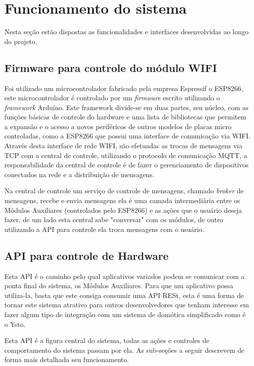 \chapter{Funcionamento do sistema}

Nesta seção estão dispostas as funcionalidades e interfaces desenvolvidas ao longo do projeto.

\section{Firmware para controle do módulo WIFI}

Foi utilizado um microcontrolador fabricado pela empresa Espressif o ESP8266, este microcontrolador é controlado por um \textit{firmware} escrito utilizando o \textit{framework} Arduíno. Este framework divide-se em duas partes, seu núcleo, com as funções básicas de controle do hardware e uma lista de bibliotecas que permitem a expansão e o acesso a novos periféricos de outros modelos de placas micro controladas, como a ESP8266 que possui uma interface de comunicação via WIFI. Através desta interface de rede WIFI, são efetuadas as trocas de mensagens via TCP com a central de controle, utilizando o protocolo de comunicação MQTT, a responsabilidade da central de controle é de fazer o gerenciamento de dispositivos conectados na rede e a distribuição de mensagens.

Na central de controle um serviço de controle de mensagens, chamado \textit{broker} de mensagens, recebe e envia mensagens ela é uma camada intermediária entre os Módulos Auxiliares (controlados pelo ESP8266) e as ações que o usuário deseja fazer, de um lado esta central sabe "conversar" com os módulos, de outro utilizando a API para controle ela troca mensagens com o usuário.

\section{API para controle de Hardware}

Esta API é o caminho pelo qual aplicativos variados podem se comunicar com a ponta final do sistema, os Módulos Auxiliares. Para que um aplicativo possa utiliza-la, basta que este consiga consumir uma API RESt, esta é uma forma de tornar este sistema atrativo para outros desenvolvedores que tenham interesse em fazer algum tipo de integração com um sistema de domótica simplificado como é o Ysto.

Esta API é a figura central do sistema, todas as ações e controles de comportamento do sistema passam por ela. As sub-seções a seguir descrevem de forma mais detalhada seu funcionamento.

